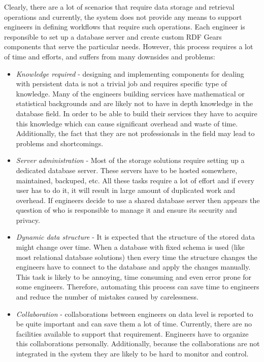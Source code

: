 Clearly, there are a lot of scenarios that require data storage and retrieval operations and currently, the system does not provide any means to support engineers in defining workflows that require such operations. Each engineer is responsible to set up a database server and create custom RDF Gears components that serve the particular needs. However, this process requires a lot of time and efforts, and suffers from many downsides and problems:

\begin{itemize}
	\item \textit{Knowledge required} - designing and implementing components for dealing with persistent data is not a trivial job and requires specific type of knowledge. Many of the engineers building services have mathematical or statistical backgrounds and are likely not to have in depth knowledge in the database field. In order to be able to build their services they have to acquire this knowledge which can cause significant overhead and waste of time. Additionally, the fact that they are not professionals in the field may lead to problems and shortcomings.
	
	\item \textit{Server administration} - Most of the storage solutions require setting up a dedicated database server. These servers have to be hosted somewhere, maintained, backuped, etc. All these tasks require a lot of effort and if every user has to do it, it will result in large amount of duplicated work and overhead. If engineers decide to use a shared database server then appears the question of who is responsible to manage it and ensure its security and privacy.
	
	\item \textit{Dynamic data structure} - It is expected that the structure of the stored data might change over time. When a database with fixed schema is used (like most relational database solutions) then every time the structure changes the engineers have to connect to the database and apply the changes manually. This task is likely to be annoying, time consuming and even error prone for some engineers. Therefore, automating this process can save time to engineers and reduce the number of mistakes caused by carelessness. 
	
	\item \textit{Collaboration} - collaborations between engineers on data level is reported to be quite important and can save them a lot of time. Currently, there are no facilities available to support that requirement. Engineers have to organize this collaborations personally. Additionally, because the collaborations are not integrated in the system they are likely to be hard to monitor and control.
	

\end{itemize}
